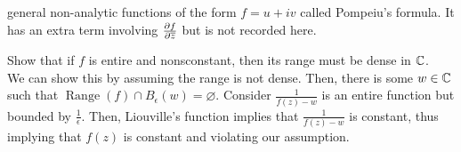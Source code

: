 \documentclass[11pt,leqno,oneside]{amsart}
\begin{document}
  general non-analytic functions of the form $f=u+iv$ called Pompeiu's
  formula. It has an extra term involving $\frac{\partial f}{\partial
    \overline{z}}$ but is not recorded here.
  \begin{example}
    Show that if $f$ is entire and nonsconstant, then its range must
    be dense in ${\mathbb C}$. \\

    We can show this by assuming the range is not dense. Then, there
    is some $w \in {\mathbb C}$ such that $\operatorname{Range}(f) \cap
    B_\epsilon(w) = \varnothing$. Consider $\frac{1}{f(z)-w}$ is an
    entire function but bounded by $\frac{1}{\epsilon}$. Then,
    Liouville's function implies that $\frac{1}{f(z)-w}$ is constant,
    thus implying that $f(z)$ is constant and violating our assumption.
  \end{example}
\end{document}
